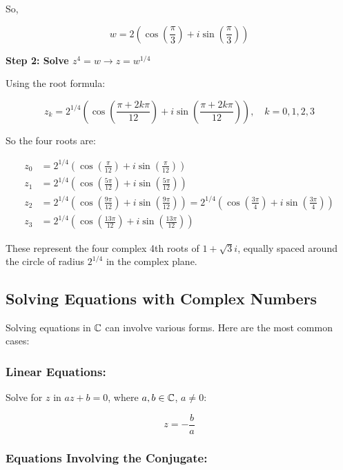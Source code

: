So,

\[
	w = 2 \left( \cos\left( \frac{\pi}{3} \right) + i \sin\left( \frac{\pi}{3} \right) \right)
\]

\textbf{Step 2: Solve \( z^4 = w \to z = w^{1/4} \)}

Using the root formula:

\[
	z_k = 2^{1/4} \left( \cos\left( \frac{\pi + 2k\pi}{12} \right) + i \sin\left( \frac{\pi + 2k\pi}{12} \right) \right), \quad k = 0, 1, 2, 3
\]

So the four roots are:

\begin{align*}
	z_0 & = 2^{1/4} \left( \cos\left( \frac{\pi}{12} \right) + i \sin\left( \frac{\pi}{12} \right) \right)                                                                                                    \\
	z_1 & = 2^{1/4} \left( \cos\left( \frac{5\pi}{12} \right) + i \sin\left( \frac{5\pi}{12} \right) \right)                                                                                                  \\
	z_2 & = 2^{1/4} \left( \cos\left( \frac{9\pi}{12} \right) + i \sin\left( \frac{9\pi}{12} \right) \right) = 2^{1/4} \left( \cos\left( \frac{3\pi}{4} \right) + i \sin\left( \frac{3\pi}{4} \right) \right) \\
	z_3 & = 2^{1/4} \left( \cos\left( \frac{13\pi}{12} \right) + i \sin\left( \frac{13\pi}{12} \right) \right)
\end{align*}

These represent the four complex 4th roots of \( 1 + \sqrt{3}i \), equally spaced around the circle of radius \( 2^{1/4} \) in the complex plane.

\subsection{Solving Equations with Complex Numbers}

Solving equations in \( \mathbb{C} \) can involve various forms. Here are the most common cases:

\subsubsection{Linear Equations:}

Solve for \( z \) in \( az + b = 0 \), where \( a, b \in \mathbb{C} \), \( a \neq 0 \):
	
\[
	z = -\frac{b}{a}
\]

\subsubsection{Equations Involving the Conjugate:}

